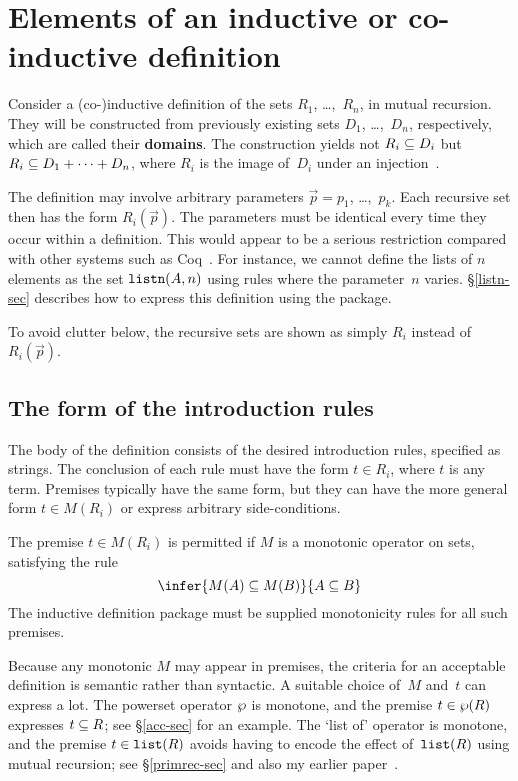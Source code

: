 \section{Elements of an inductive or co-inductive definition}\label{basic-sec}
Consider a (co-)inductive definition of the sets $R_1$, \ldots,~$R_n$, in
mutual recursion.  They will be constructed from previously existing sets
$D_1$, \ldots,~$D_n$, respectively, which are called their {\bf domains}. 
The construction yields not $R_i\subseteq D_i$ but $R_i\subseteq D_1+\cdots+D_n$, where
$R_i$ is the image of~$D_i$ under an injection~\cite[\S4.5]{paulson-set-II}.

The definition may involve arbitrary parameters $\vec{p}=p_1$,
\ldots,~$p_k$.  Each recursive set then has the form $R_i(\vec{p})$.  The
parameters must be identical every time they occur within a definition.  This
would appear to be a serious restriction compared with other systems such as
Coq~\cite{paulin92}.  For instance, we cannot define the lists of
$n$ elements as the set ${\tt listn}(A,n)$ using rules where the parameter~$n$
varies.  \S\ref{listn-sec} describes how to express this definition using the
package.

To avoid clutter below, the recursive sets are shown as simply $R_i$
instead of $R_i(\vec{p})$.

\subsection{The form of the introduction rules}\label{intro-sec}
The body of the definition consists of the desired introduction rules,
specified as strings.  The conclusion of each rule must have the form $t\in
R_i$, where $t$ is any term.  Premises typically have the same form, but
they can have the more general form $t\in M(R_i)$ or express arbitrary
side-conditions.

The premise $t\in M(R_i)$ is permitted if $M$ is a monotonic operator on
sets, satisfying the rule 
\[ \infer{M(A)\sbs M(B)}{A\sbs B} \]
The inductive definition package must be supplied monotonicity rules for
all such premises.

Because any monotonic $M$ may appear in premises, the criteria for an
acceptable definition is semantic rather than syntactic.  A suitable choice
of~$M$ and~$t$ can express a lot.  The powerset operator $\wp$ is
monotone, and the premise $t\in\wp(R)$ expresses $t\subseteq R$; see
\S\ref{acc-sec} for an example.  The `list of' operator is monotone, and
the premise $t\in{\tt list}(R)$ avoids having to encode the effect of~${\tt list}(R)$
using mutual recursion; see \S\ref{primrec-sec} and also my earlier
paper~\cite[\S4.4]{paulson-set-II}.

